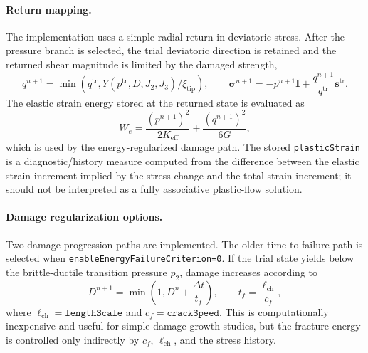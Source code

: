 \paragraph{Return mapping.}
The implementation uses a simple radial return in deviatoric stress.  After the pressure branch is selected, the trial deviatoric direction is retained and the returned shear magnitude is limited by the damaged strength,
\begin{equation}
  q^{n+1}=\min\left(q^{\mathrm{tr}},Y(p^{\mathrm{tr}},D,J_2,J_3)/\xi_{\mathrm{tip}}\right),
  \qquad
  \boldsymbol{\sigma}^{n+1}=-p^{n+1}\mathbf{I}+\frac{q^{n+1}}{q^{\mathrm{tr}}}\mathbf{s}^{\mathrm{tr}}.
  \label{eq:ceramic-radial-return}
\end{equation}
The elastic strain energy stored at the returned state is evaluated as
\begin{equation}
  W_e = \frac{(p^{n+1})^2}{2K_{\mathrm{eff}}}+\frac{(q^{n+1})^2}{6G},
  \label{eq:ceramic-elastic-energy}
\end{equation}
which is used by the energy-regularized damage path.  The stored \texttt{plasticStrain} is a diagnostic/history measure computed from the difference between the elastic strain increment implied by the stress change and the total strain increment; it should not be interpreted as a fully associative plastic-flow solution.

\paragraph{Damage regularization options.}
Two damage-progression paths are implemented.  The older time-to-failure path is selected when \texttt{enableEnergyFailureCriterion=0}.  If the trial state yields below the brittle-ductile transition pressure \(p_2\), damage increases according to
\begin{equation}
  D^{n+1}=\min\left(1,D^n+\frac{\Delta t}{t_f}\right),
  \qquad
  t_f=\frac{\ell_{\mathrm{ch}}}{c_f},
  \label{eq:ceramic-time-to-failure}
\end{equation}
where \(\ell_{\mathrm{ch}}=\texttt{lengthScale}\) and \(c_f=\texttt{crackSpeed}\).  This is computationally inexpensive and useful for simple damage growth studies, but the fracture energy is controlled only indirectly by \(c_f\), \(\ell_{\mathrm{ch}}\), and the stress history.

